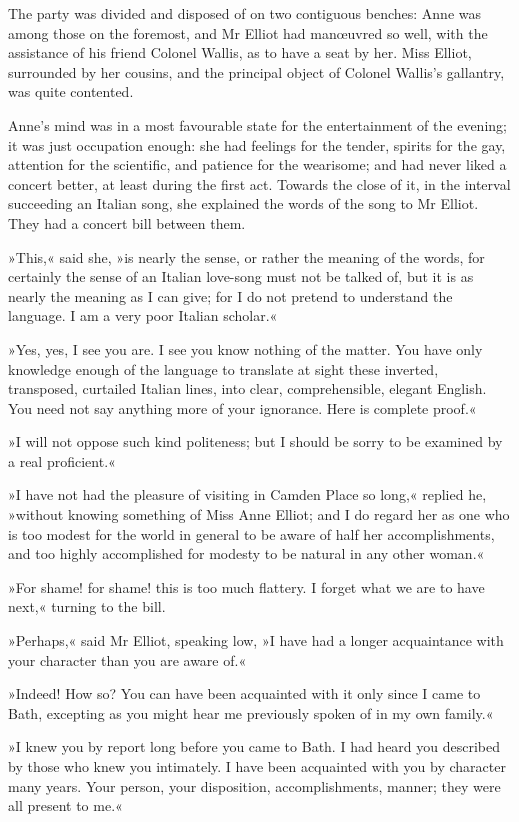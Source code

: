 The party was divided and disposed of on two contiguous benches: Anne was among those on the foremost, and Mr Elliot had manœuvred so well, with the assistance of his friend Colonel Wallis, as to have a seat by her. Miss Elliot, surrounded by her cousins, and the principal object of Colonel Wallis's gallantry, was quite contented.

Anne's mind was in a most favourable state for the entertainment of the evening; it was just occupation enough: she had feelings for the tender, spirits for the gay, attention for the scientific, and patience for the wearisome; and had never liked a concert better, at least during the first act. Towards the close of it, in the interval succeeding an Italian song, she explained the words of the song to Mr Elliot. They had a concert bill between them.

»This,« said she, »is nearly the sense, or rather the meaning of the words, for certainly the sense of an Italian love-song must not be talked of, but it is as nearly the meaning as I can give; for I do not pretend to understand the language. I am a very poor Italian scholar.«

»Yes, yes, I see you are. I see you know nothing of the matter. You have only knowledge enough of the language to translate at sight these inverted, transposed, curtailed Italian lines, into clear, comprehensible, elegant English. You need not say anything more of your ignorance. Here is complete proof.«

»I will not oppose such kind politeness; but I should be sorry to be examined by a real proficient.«

»I have not had the pleasure of visiting in Camden Place so long,« replied he, »without knowing something of Miss Anne Elliot; and I do regard her as one who is too modest for the world in general to be aware of half her accomplishments, and too highly accomplished for modesty to be natural in any other woman.«

»For shame! for shame! this is too much flattery. I forget what we are to have next,« turning to the bill.

»Perhaps,« said Mr Elliot, speaking low, »I have had a longer acquaintance with your character than you are aware of.«

»Indeed! How so? You can have been acquainted with it only since I came to Bath, excepting as you might hear me previously spoken of in my own family.«

»I knew you by report long before you came to Bath. I had heard you described by those who knew you intimately. I have been acquainted with you by character many years. Your person, your disposition, accomplishments, manner; they were all present to me.«

